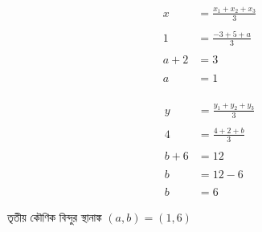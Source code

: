 \documentclass{article}
\begin{document}
	\begin{multicols}{2}
		\begin{align*}
			x&=\frac{x_1+x_2+x_3}{3}\\
			\\
			1&=\frac{-3+5+a}{3}\\
			\\
			a+2&=3\\
			\\
			a&=1
		\end{align*}
		\\
		\begin{align*}
			y&=\frac{y_1+y_2+y_3}{3}\\
			\\
			4&=\frac{4+2+b}{3}\\
			\\
			b+6&=12\\
			\\
			b&=12-6\\
			\\
			b&=6
		\end{align*}
	\end{multicols}
তৃতীয় কৌণিক বিন্দুর স্থানাঙ্ক $(a,b)=(1,6)$
\end{document}
